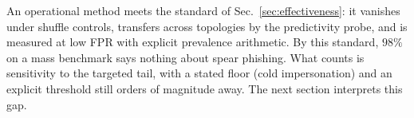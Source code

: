 \noindent An operational method meets the standard of Sec.~\ref{sec:effectiveness}: it vanishes under
shuffle controls, transfers across topologies by the predictivity probe, and is measured at low FPR with
explicit prevalence arithmetic. By this standard, $98\%$ on a mass benchmark says nothing about spear phishing.
What counts is sensitivity to the targeted tail, with a stated floor (cold impersonation) and an explicit
threshold still orders of magnitude away. The next section interprets this gap.
